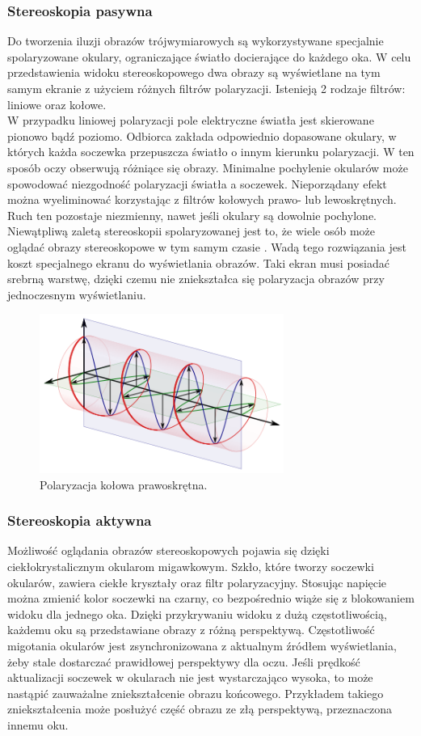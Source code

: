 \subsubsection{Stereoskopia pasywna} 
Do tworzenia iluzji obrazów trójwymiarowych są wykorzystywane specjalnie spolaryzowane okulary, ograniczające światło docierające do każdego oka. W celu przedstawienia widoku stereoskopowego dwa obrazy są wyświetlane na tym samym ekranie z użyciem różnych filtrów polaryzacji. 
Istenieją 2 rodzaje filtrów: liniowe oraz kołowe.\\
W przypadku liniowej polaryzacji pole elektryczne światła jest skierowane pionowo bądź poziomo. Odbiorca zakłada odpowiednio dopasowane okulary, w których każda soczewka przepuszcza światło o innym kierunku polaryzacji. W ten sposób oczy obserwują różniące się obrazy. Minimalne pochylenie okularów może spowodować niezgodność polaryzacji światła a soczewek. Nieporządany efekt można wyeliminować korzystając z filtrów kołowych prawo- lub lewoskrętnych. Ruch ten pozostaje niezmienny, nawet jeśli okulary są dowolnie pochylone.\\
Niewątpliwą zaletą stereoskopii spolaryzowanej jest to, że wiele osób może oglądać obrazy stereoskopowe w tym samym czasie \cite{russianpage}. Wadą tego rozwiązania jest koszt specjalnego ekranu do wyświetlania obrazów. Taki ekran musi posiadać srebrną warstwę, dzięki czemu nie zniekształca się polaryzacja obrazów przy jednoczesnym wyświetlaniu.
\begin{figure}[H]
		\centering
 		\includegraphics[width=8cm]{circular.png}
    	\caption{Polaryzacja kołowa prawoskrętna.}
 		\label{rys3}
\end{figure}

\subsubsection{Stereoskopia aktywna} 
Możliwość oglądania obrazów stereoskopowych pojawia się dzięki ciekłokrystalicznym okularom migawkowym. Szkło, które tworzy soczewki okularów, zawiera ciekłe kryształy oraz filtr polaryzacyjny. Stosując napięcie można zmienić kolor soczewki na czarny, co bezpośrednio wiąże się z blokowaniem widoku dla jednego oka. Dzięki przykrywaniu widoku z dużą częstotliwością, każdemu oku są przedstawiane obrazy z różną perspektywą. Częstotliwość migotania okularów jest zsynchronizowana z aktualnym źródłem wyświetlania, żeby stale dostarczać prawidłowej perspektywy dla oczu. Jeśli prędkość aktualizacji soczewek w okularach nie jest wystarczająco wysoka, to może nastąpić zauważalne zniekształcenie obrazu końcowego. Przykładem takiego zniekształcenia może posłużyć część obrazu ze złą perspektywą, przeznaczona innemu oku. 

